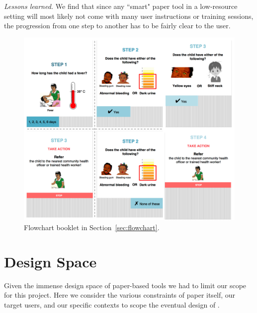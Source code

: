 \documentclass{sig-alternate}
\begin{document}
\emph{Lessons learned.}
We find that since any ``smart" paper tool in a low-resource setting will most likely not come with many user instructions or training sessions, the progression from one step to another has to be fairly clear to the user.

\begin{figure}
\centering
\includegraphics[width=\linewidth]{img/flowchart.png}
\caption{Flowchart booklet in Section~\ref{sec:flowchart}.}
\label{fig:flowchart}
\end{figure}


\section{Design Space}
\label{sec:constraints}

Given the immense design space of paper-based tools we had to limit our scope for this project. 
Here we consider the various constraints of paper itself, our target users, and our specific contexts to scope the eventual design of \nifty.

\end{document}
